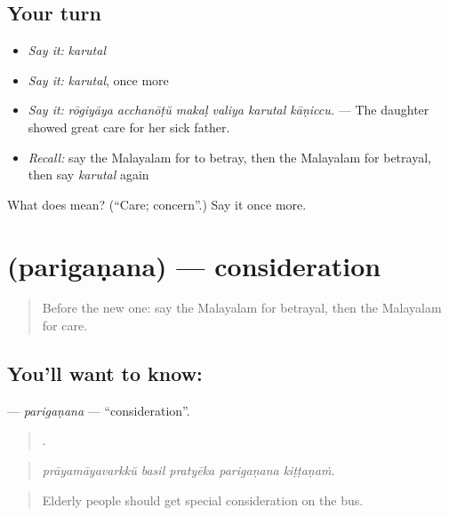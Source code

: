 \subsection*{Your turn}
\begin{itemize}
\raggedright
  \item \emph{Say it:} \emph{karutal}
  \item \emph{Say it:} \emph{karutal}, once more
  \item \emph{Say it:} \emph{rōgiyāya acchanōṭŭ makaḷ valiya karutal kāṇiccu.} — The daughter showed great care for her sick father.
  \item \emph{Recall:} say the Malayalam for to betray, then the Malayalam for betrayal, then say \emph{karutal} again
\end{itemize}

\begin{tcolorbox}[breakable,colback=teal!4,colframe=teal!35!black,title={Before you move on}]
What does  mean? (\textquotedblleft{}Care; concern\textquotedblright{}.) Say it once more.
\end{tcolorbox}
\section[\texorpdfstring{\ml{പരിഗണന} (parigaṇana)}{പരിഗണന (parigaṇana)}]{ (parigaṇana) — consideration}

\label{lesson:ML-C556-pariganana}



\begin{quote}
Before the new one: say the Malayalam for betrayal, then the Malayalam for care.
\end{quote}

\subsection*{You'll want to know: }
\textbf{} — \emph{parigaṇana} — \textquotedblleft{}consideration\textquotedblright{}.

\begin{quote}
    .
\end{quote}

\begin{quote}
\emph{prāyamāyavarkkŭ basil pratyēka parigaṇana kiṭṭaṇaṁ.}
\end{quote}

\begin{quote}
Elderly people should get special consideration on the bus.
\end{quote}

